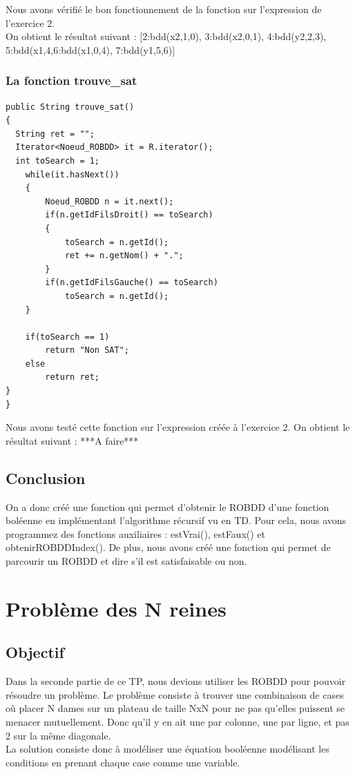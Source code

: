 \documentclass{article}
\begin{document}
Nous avons vérifié le bon fonctionnement de la fonction sur l'expression de l'exercice 2.\\
On obtient le résultat suivant : [2:bdd(x2,1,0), 3:bdd(x2,0,1), 4:bdd(y2,2,3), 5:bdd(x1,4,6:bdd(x1,0,4), 7:bdd(y1,5,6)]
\subsubsection{La fonction trouve\_sat}
\begin{verbatim}
public String trouve_sat()
{
  String ret = "";
  Iterator<Noeud_ROBDD> it = R.iterator();
  int toSearch = 1;
	while(it.hasNext())
	{
		Noeud_ROBDD n = it.next();
		if(n.getIdFilsDroit() == toSearch)
		{
			toSearch = n.getId();
			ret += n.getNom() + ".";
		}
		if(n.getIdFilsGauche() == toSearch)
			toSearch = n.getId();
	}
	
	if(toSearch == 1)
		return "Non SAT";
	else
		return ret;
}
}
\end{verbatim}
Nous avons testé cette fonction sur l'expression créée à l'exercice 2.
On obtient le résultat suivant : ***A faire***
\subsection{Conclusion}
On a donc créé une fonction qui permet d'obtenir le ROBDD d'une fonction boléenne en implémentant l'algorithme récursif vu en TD. Pour cela, nous avons programmez des fonctions auxiliaires : estVrai(), estFaux() et obtenirROBDDIndex(). De plus, nous avons créé une fonction qui permet de parcourir un ROBDD et dire s'il est satisfaisable ou non.
\section{Problème des N reines}
\subsection{Objectif}
Dans la seconde partie de ce TP, nous devions utiliser les ROBDD pour pouvoir résoudre un problème. Le problème consiste à trouver une combinaison de cases où placer N dames sur un plateau de taille NxN pour ne pas qu'elles puissent se menacer mutuellement. Donc qu'il y en ait une par colonne, une par ligne, et pas 2 sur la même diagonale.\\
La solution consiste donc à modéliser une équation booléenne modélisant les conditions en prenant chaque case comme une variable.
\end{document}
